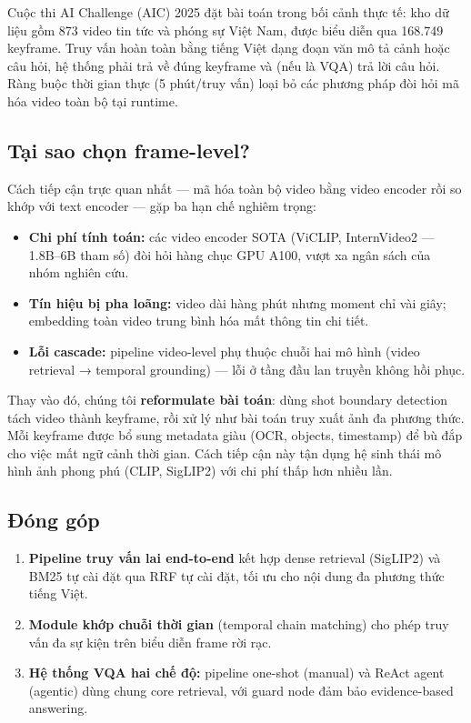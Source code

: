 \documentclass[12pt,a4paper,onecolumn]{article}
\begin{document}
Cuộc thi AI Challenge (AIC) 2025 đặt bài toán trong bối cảnh thực tế: kho dữ liệu gồm 873 video tin tức và phóng sự Việt Nam, được biểu diễn qua 168.749 keyframe. Truy vấn hoàn toàn bằng tiếng Việt dạng đoạn văn mô tả cảnh hoặc câu hỏi, hệ thống phải trả về đúng keyframe và (nếu là VQA) trả lời câu hỏi. Ràng buộc thời gian thực (5 phút/truy vấn) loại bỏ các phương pháp đòi hỏi mã hóa video toàn bộ tại runtime.

\subsection{Tại sao chọn frame-level?}

Cách tiếp cận trực quan nhất — mã hóa toàn bộ video bằng video encoder rồi so khớp với text encoder — gặp ba hạn chế nghiêm trọng:

\begin{itemize}
  \item \textbf{Chi phí tính toán:} các video encoder SOTA (ViCLIP, InternVideo2 — 1.8B–6B tham số) đòi hỏi hàng chục GPU A100, vượt xa ngân sách của nhóm nghiên cứu.
  \item \textbf{Tín hiệu bị pha loãng:} video dài hàng phút nhưng moment chỉ vài giây; embedding toàn video trung bình hóa mất thông tin chi tiết.
  \item \textbf{Lỗi cascade:} pipeline video-level phụ thuộc chuỗi hai mô hình (video retrieval → temporal grounding) — lỗi ở tầng đầu lan truyền không hồi phục.
\end{itemize}


Thay vào đó, chúng tôi \textbf{reformulate bài toán}: dùng shot boundary detection tách video thành keyframe, rồi xử lý như bài toán truy xuất ảnh đa phương thức. Mỗi keyframe được bổ sung metadata giàu (OCR, objects, timestamp) để bù đắp cho việc mất ngữ cảnh thời gian. Cách tiếp cận này tận dụng hệ sinh thái mô hình ảnh phong phú (CLIP, SigLIP2) với chi phí thấp hơn nhiều lần.

\subsection{Đóng góp}

\begin{enumerate}
  \item \textbf{Pipeline truy vấn lai end-to-end} kết hợp dense retrieval (SigLIP2) và BM25 tự cài đặt qua RRF tự cài đặt, tối ưu cho nội dung đa phương thức tiếng Việt.
  \item \textbf{Module khớp chuỗi thời gian} (temporal chain matching) cho phép truy vấn đa sự kiện trên biểu diễn frame rời rạc.
  \item \textbf{Hệ thống VQA hai chế độ:} pipeline one-shot (manual) và ReAct agent (agentic) dùng chung core retrieval, với guard node đảm bảo evidence-based answering.
\end{enumerate}
\end{document}

